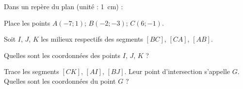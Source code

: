 Dans un repère du plan (unité : 1~cm) :
\begin{myenumerate}
\item Place les points $A(-7;1)$; $B(-2;-3)$; $C(6;-1)$.
\item Soit $I$, $J$, $K$ les milieux respectifs des segments $[BC]$,
$[CA]$, $[AB]$.\par Quelles sont les coordonnées des points $I$, $J$,
$K$ ?
\item Trace les segments $[CK]$, $[AI]$, $[BJ]$. Leur point
d'intersection s'appelle $G$. Quelles sont les coordonnées du point
$G$ ?
\end{myenumerate}
